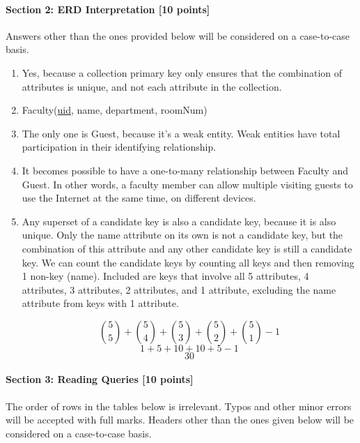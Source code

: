 \documentclass[a4paper,12pt,leqno]{article}
\begin{document}
\newpage
\paragraph{\textbf{Section 2: ERD Interpretation [10 points]}\\}
Answers other than the ones provided below will be considered on a case-to-case basis.


\begin{enumerate}
\item 
Yes, because a collection primary key only ensures that the combination of attributes is unique, and not each attribute in the collection.

\item
Faculty(\underline{uid}, name, department, roomNum)

\item
The only one is Guest, because it's a weak entity. Weak entities have total participation in their identifying relationship. 

\item
It becomes possible to have a one-to-many relationship between Faculty and Guest. In other words, a faculty member can allow multiple visiting guests to use the Internet at the same time, on different devices. 

\item Any superset of a candidate key is also a candidate key, because it is also unique. Only the name attribute on its own is not a candidate key, but the combination of this attribute and any other candidate key is still a candidate key. We can count the candidate keys by counting all keys and then removing 1 non-key (name). Included are keys that involve all 5 attributes, 4 attributes, 3 attributes, 2 attributes, and 1 attribute, excluding the name attribute from keys with 1 attribute.

$${5\choose 5} + {5\choose 4} + {5\choose 3} + {5\choose 2} + {5\choose 1} - 1$$
$$1 + 5 + 10 + 10 + 5 - 1$$
$$30$$

\end{enumerate}

\newpage
\paragraph{\textbf{Section 3: Reading Queries [10 points]}\\}
	The order of rows in the tables below is irrelevant. Typos and other minor errors will be accepted with full marks. Headers other than the ones given below will be considered on a case-to-case basis.
\end{document}
